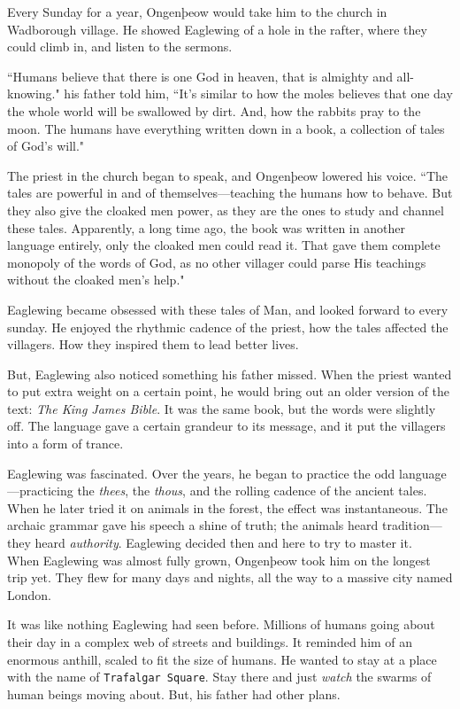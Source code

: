 Every Sunday for a year, Ongenþeow would take him to the church in Wadborough village.
He showed Eaglewing of a hole in the rafter, where they could climb in, and listen to the sermons.

``Humans believe that there is one God in heaven, that is almighty and all-knowing." his father told him, ``It's similar to how the moles believes that one day the whole world will be swallowed by dirt.
And, how the rabbits pray to the moon.
The humans have everything written down in a book, a collection of tales of God's will."

The priest in the church began to speak, and Ongenþeow lowered his voice. ``The tales are powerful in and of themselves---teaching the humans how to behave. But they also give the cloaked men power, as they are the ones to study and channel these tales. Apparently, a long time ago, the book was written in another language entirely, only the cloaked men could read it. That gave them complete monopoly of the words of God, as no other villager could parse His teachings without the cloaked men's help."

Eaglewing became obsessed with these tales of Man, and looked forward to every sunday.
He enjoyed the rhythmic cadence of the priest, how the tales affected the villagers. How they inspired them to lead better lives.

But, Eaglewing also noticed something his father missed. When the priest wanted to put extra weight on a certain point, he would bring out an older version of the text: \textit{The King James Bible}. It was the same book, but the words were slightly off.
The language gave a certain grandeur to its message, and it put the villagers into a form of trance.

Eaglewing was fascinated. Over the years, he began to practice the odd language---practicing the \textit{thees}, the \textit{thous}, and the rolling cadence of the ancient tales. When he later tried it on animals in the forest, the effect was instantaneous. The archaic grammar gave his speech a shine of truth; the animals heard tradition---they heard \textit{authority}. Eaglewing decided then and here to try to master it.\\

When Eaglewing was almost fully grown, Ongenþeow took him on the longest trip yet.
They flew for many days and nights, all the way to a massive city named London.

It was like nothing Eaglewing had seen before.
Millions of humans going about their day in a complex web of streets and buildings.
It reminded him of an enormous anthill, scaled to fit the size of humans.
He wanted to stay at a place with the name of \texttt{Trafalgar Square}.
Stay there and just \textit{watch} the swarms of human beings moving about.
But, his father had other plans.

